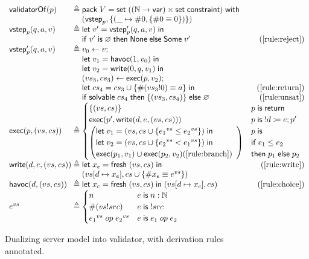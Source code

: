 \begin{figure}
\[\begin{array}{l@{\;}r@{\;}l}
\validatorOf(p)&\triangleq&\existT{V}{\Set((\Nat\to\Var)\times\Set\constraint)}{\\
  &&(\vstep_p,\{(\_\mapsto\#0,\{\#0\equiv0\})\})}\\
\vstep_p(q,a,v)&\triangleq&\letin{v'}{\vstep'_p(q,a,v)}\\
&&\If v'\Is\varnothing\Then\None\Else\Some v'\hfill(\ref{rule:reject})\\
\vstep'_p(q,a,v)&\triangleq&v_0\gets v;\\
&&\letin{v_1}{\Havoc(1,v_0)}\\
&&\letin{v_2}{\Write(0,q,v_1)}\\
&&(vs_3,cs_3)\gets\Exec(p,v_2);\\
&&\letin{cs_4}{cs_3\cup\{\#(vs_3!0)\equiv a\}}\hfill(\ref{rule:return})\\
&&\If\solvable cs_4\Then\{(vs_3,cs_4)\}\Else\varnothing\hfill(\ref{rule:unsat})\\
\Exec(p,(vs,cs))&\triangleq&\begin{cases}
  \{(vs,cs)\}&p\Is\Return\\
  \Exec(p',\Write(d,e,(vs,cs)))&p\Is !d\coloneqq e;p'\\
  \left(\begin{array}{@{}l}
    \letin{v_1}{(vs,cs\cup\{{e_1}^{vs}\le{e_2}^{vs}\})}\\
    \letin{v_2}{(vs,cs\cup\{{e_2}^{vs}<{e_1}^{vs}\})}\\
    \Exec(p_1,v_1)\cup\Exec(p_2,v_2)\hfill(\ref{rule:branch})
  \end{array}\right)&\begin{array}{@{}l}p\Is\\
    \If e_1\le e_2\\
    \tthen p_1\Else p_2\end{array}
\end{cases}\\
\Write(d,e,(vs,cs))&\triangleq&\letin{x_e}{\Fresh (vs,cs)}\hfill(\ref{rule:write})\\
&&(\update{vs}{d}{x_e},cs\cup\{\#x_e\equiv e^{vs}\})\\
\Havoc(d,(vs,cs))&\triangleq&\letin{x_c}{\Fresh (vs,cs)}(\update{vs}{d}{x_c},cs)\hfill(\ref{rule:choice})\\
e^{vs}&\triangleq&\begin{cases}
  n&e\Is n:\Nat\\
  \#(vs!src)&e\Is!src\\
  {e_1}^{vs}\oop{e_2}^{vs}&e\Is e_1\oop e_2
\end{cases}
\end{array}\]
\caption[Dualizing server model into validator]{Dualizing server model into
  validator, with derivation rules annotated.}
\label{fig:dualize}
\end{figure}

